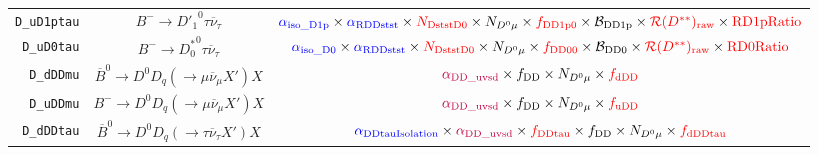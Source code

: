 \begin{landscape}
\begin{table}
\begin{tabular}{r|c|c}
      \texttt{D\_uD1ptau} &                 $B^- \rightarrow {D'_1}^0 \tau \overline{\nu}_\tau$                  &                          $\textcolor{blue}{\alpha_\text{iso\_D1p}} \times \textcolor{blue}{\alpha_\text{RDDstst}} \times \textcolor{red}{N_\text{DststD0}} \times N_{D^0 \mu} \times \textcolor{red}{f_\text{DD1p0}} \times \mathcal{B}_\text{DD1p} \times \textcolor{red}{\mathcal{R}(D^{**})_\text{raw}} \times \textcolor{red}{\text{RD1pRatio}}$                          \\
       \texttt{D\_uD0tau} &                 $B^- \rightarrow {D^*_0}^0 \tau \overline{\nu}_\tau$                 &                            $\textcolor{blue}{\alpha_\text{iso\_D0}} \times \textcolor{blue}{\alpha_\text{RDDstst}} \times \textcolor{red}{N_\text{DststD0}} \times N_{D^0 \mu} \times \textcolor{red}{f_\text{DD00}} \times \mathcal{B}_\text{DD0} \times \textcolor{red}{\mathcal{R}(D^{**})_\text{raw}} \times \textcolor{red}{\text{RD0Ratio}}$                            \\
        \texttt{D\_dDDmu} &    $\overline{B}^0 \rightarrow D^0 D_q (\rightarrow \mu \overline{\nu}_\mu X') X$    &                                                                                                                            $\textcolor{purple}{\alpha_\text{DD\_uvsd}} \times f_\text{DD} \times N_{D^0 \mu} \times \textcolor{red}{f_\text{dDD}}$                                                                                                                            \\
        \texttt{D\_uDDmu} &         $B^- \rightarrow D^0 D_q (\rightarrow \mu \overline{\nu}_\mu X') X$          &                                                                                                                            $\textcolor{purple}{\alpha_\text{DD\_uvsd}} \times f_\text{DD} \times N_{D^0 \mu} \times \textcolor{red}{f_\text{uDD}}$                                                                                                                            \\
       \texttt{D\_dDDtau} &   $\overline{B}^0 \rightarrow D^0 D_q (\rightarrow \tau \overline{\nu}_\tau X') X$   &                                                                            $\textcolor{blue}{\alpha_\text{DDtauIsolation}} \times \textcolor{purple}{\alpha_\text{DD\_uvsd}} \times \textcolor{red}{f_\text{DDtau}} \times f_\text{DD} \times N_{D^0 \mu} \times \textcolor{red}{f_\text{dDDtau}}$                                                                            \\

\end{tabular}
\end{table}
\end{landscape}
